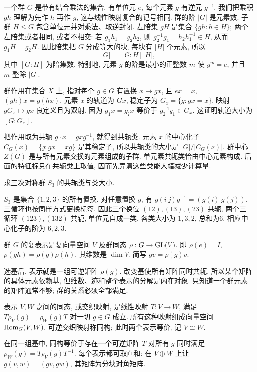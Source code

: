 一个群 $G$ 是带有结合乘法的集合, 有单位元 $e$, 每个元素 $g$ 有逆元 $g^{-1}$. 我们把乘积 $gh$ 理解为先作 $h$ 再作 $g$, 这与线性映射复合的记号相同. 群的阶 $|G|$ 是元素数. 子群 $H\le G$ 包含单位元并对乘法、取逆封闭. 左陪集 $gH$ 是集合 $\{gh:h\in H\}$; 两个左陪集或者相同, 或者不相交: 若 $g_1h_1=g_2h_2$, 则 $g_2^{-1}g_1=h_2h_1^{-1}\in H$, 从而 $g_1H=g_2H$. 因此陪集把 $G$ 分成等大的块, 每块有 $|H|$ 个元素, 所以
\[
 |G|=[G:H]|H|,
\]
其中 $[G:H]$ 为陪集数. 特别地, 元素 $g$ 的阶是最小的正整数 $m$ 使 $g^m=e$, 并且 $m$ 整除 $|G|$.

群作用在集合 $X$ 上, 指对每个 $g\in G$ 有置换 $x\mapsto gx$, 且 $ex=x$, $(gh)x=g(hx)$. 元素 $x$ 的轨道为 $Gx$, 稳定子为 $G_x=\{g:gx=x\}$. 映射 $gG_x\mapsto gx$ 良定义且为双射, 因为 $g_1x=g_2x$ 等价于 $g_2^{-1}g_1\in G_x$. 这证明轨道大小为 $[G:G_x]$.

把作用取为共轭 $g\cdot x=gxg^{-1}$, 就得到共轭类. 元素 $x$ 的中心化子 $C_G(x)=\{g:gx=xg\}$ 是其稳定子, 所以共轭类的大小是 $|G|/|C_G(x)|$. 群中心 $Z(G)$ 是与所有元素交换的元素组成的子群. 单元素共轭类恰由中心元素构成. 后面的特征标只在共轭类上取值, 因而先弄清这些类能大幅减少计算量.

\begin{example}\label{ex:s3classes}
求三次对称群 $S_3$ 的共轭类与类大小.
\end{example}
\begin{solution}
$S_3$ 是集合 $\{1,2,3\}$ 的所有置换. 对任意置换 $g$, 有 $g(i\ j)g^{-1}=(g(i)\ g(j))$, 三循环也按同样方式更换标签. 因此三个换位 $(12),(13),(23)$ 共轭, 两个三循环 $(123),(132)$ 共轭, 单位元自成一类. 各类大小为 $1,3,2$, 总和为6. 相应中心化子的阶为 $6,2,3$.
\end{solution}

\begin{definition}
群 $G$ 的复表示是复向量空间 $V$ 及群同态 $\rho:G\to\operatorname{GL}(V)$. 即 $\rho(e)=I$, $\rho(gh)=\rho(g)\rho(h)$. 其维数是 $\dim V$. 简写 $gv=\rho(g)v$.
\end{definition}
选基后, 表示就是一组可逆矩阵 $\rho(g)$. 改变基使所有矩阵同时共轭. 所以某个矩阵的具体元素依赖基, 但维数、迹和整个表示的分解是内在对象. 只知道一个群元素的矩阵通常不够; 群的关系必须全部满足.

\begin{definition}
表示 $V,W$ 之间的同态, 或交织映射, 是线性映射 $T:V\to W$, 满足 $T\rho_V(g)=\rho_W(g)T$ 对一切 $g\in G$ 成立. 所有这种映射组成向量空间 $\operatorname{Hom}_G(V,W)$. 可逆交织映射称同构; 此时两个表示等价, 记 $V\cong W$.
\end{definition}
在同一组基中, 同构等价于存在一个可逆矩阵 $T$ 对所有 $g$ 同时满足 $\rho_W(g)=T\rho_V(g)T^{-1}$. 每个表示都可取直和: 在 $V\oplus W$ 上让 $g(v,w)=(gv,gw)$, 其矩阵为分块对角矩阵.

